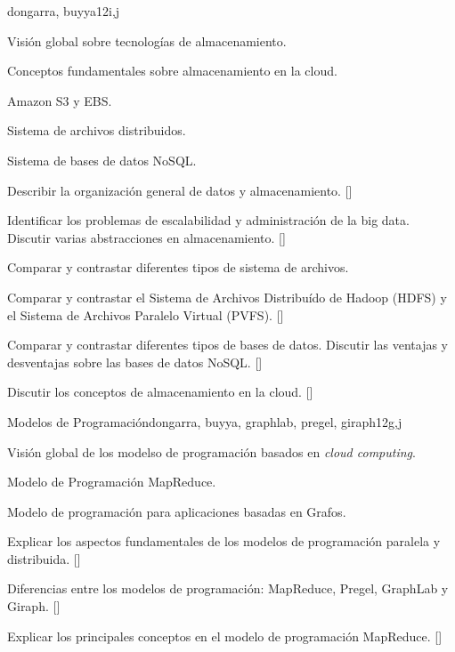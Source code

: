\begin{syllabus}
\begin{unit}{\PDCloudComputing}{}{dongarra, buyya}{12}{i,j}
\begin{topics}
    \item \PDCloudComputingTopicCloudBased
    \item Visión global sobre tecnologías de almacenamiento.
    \item Conceptos fundamentales sobre almacenamiento en la cloud.
    \item Amazon S3 y EBS.
    \item Sistema de archivos distribuidos.
    \item Sistema de bases de datos NoSQL.
\end{topics}
\begin{learningoutcomes}
    \item Describir la organización general de datos y almacenamiento. [\Familiarity]
    \item Identificar los problemas de escalabilidad y administración de la big data. Discutir varias abstracciones en almacenamiento. [\Familiarity]
    \item Comparar y contrastar diferentes tipos de sistema de archivos. 
    \item Comparar y contrastar el Sistema de Archivos Distribuído de Hadoop (HDFS) y el Sistema de Archivos Paralelo Virtual (PVFS).  [\Usage]
    \item Comparar y contrastar diferentes tipos de bases de datos. Discutir las ventajas y desventajas sobre las bases de datos NoSQL. [\Usage]
    \item Discutir los conceptos de almacenamiento en la cloud. [\Familiarity]
\end{learningoutcomes}
\end{unit}

\begin{unit}{Modelos de Programación}{}{dongarra, buyya, graphlab, pregel, giraph}{12}{g,j}
\begin{topics}
    \item Visión global de los modelso de programación basados en \textit{cloud computing}.
    \item Modelo de Programación MapReduce.
    \item Modelo de programación para aplicaciones basadas en Grafos.
\end{topics}
\begin{learningoutcomes}
    \item Explicar los aspectos fundamentales de los modelos de programación paralela y distribuida. [\Familiarity]
    \item Diferencias entre los modelos de programación: MapReduce, Pregel, GraphLab y Giraph. [\Usage]
    \item Explicar los principales conceptos en el modelo de programación MapReduce.  [\Usage]
\end{learningoutcomes}
\end{unit}

\begin{coursebibliography}
\end{coursebibliography}

\end{syllabus}

